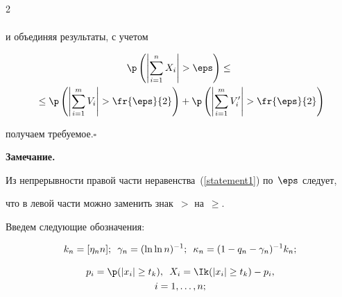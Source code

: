 \begin{multicols}{2}
\begin{multline*}
\end{multline*}

и объединяя результаты, с учетом

\begin{multline*}

\p \left(\left|\sum\limits_{i=1}^n X_i \right| > \eps \right) \leq {}\\

{}\leq 

\p \left(\left|\sum\limits_{i=1}^m V_i \right| > \fr{\eps}{2} \right) + 

\p \left(\left|\sum\limits_{i=1}^m V'_i \right| > \fr{\eps}{2} \right)

\end{multline*}

получаем требуемое.\hfill$\square$





\smallskip



\noindent

\textbf{Замечание.}

Из непрерывности правой части неравенства~(\ref{statement1}) по~$\eps$ следует, 

что в левой части можно заменить знак~$>$ на~$\geq$.





\smallskip



Введем следующие обозначения:



\vspace*{-6pt}



$$

k_n = [\eta_n n]; \enskip \gamma_n = (\ln\ln n)^{-1}; \enskip \kappa_n = (1 - q_n - \gamma_n)^{-1} k_n;

$$



\vspace*{-12pt}



\noindent

\begin{multline*}

p_i = \p(|x_i|\geq t_k), \enskip X_i = \Ik(|x_i|\geq t_k) - p_i, \\ i=1,\ldots,n;

\end{multline*}




\end{multicols}
